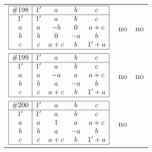 \documentclass[12pt]{article}
\theoremstyle{definition}
\newcommand{\join}{\mathbin{+}}%
\newcommand{\id}{{1'}}%
\renewcommand{\top}{1}%
\begin{document}
\begin{center}
\begin{longtable}{l|c|c}
$
\begin{array}{|c|cccc|} \hline
\#198 & \id & a & b & c \\ \hline
\id & \id & a & b & c \\
a & a & -b & 0 & a \join c \\
b & b & 0 & -a & b \\
c & c & a \join c & b & \id \join a \\ \hline
\end{array}
$
 & no  
 & no      \\[15mm]

$
\begin{array}{|c|cccc|} \hline
\#199 & \id & a & b & c \\ \hline
\id & \id & a & b & c \\
a & a & -a & a & a \join c \\
b & b & a & -a & b \\
c & c & a \join c & b & \id \join a \\ \hline
\end{array}
$
 & no  
 & no      \\[15mm]

$
\begin{array}{|c|cccc|} \hline
\#200 & \id & a & b & c \\ \hline
\id & \id & a & b & c \\
a & a & \top & a & a \join c \\
b & b & a & -a & b \\
c & c & a \join c & b & \id \join a \\ \hline
\end{array}
$
 & no  
 & \adjustbox{valign=c, max height=1.6cm}{$
\left[ \begin{array}{ccccccc}
\id & a & a & b & c & a & b \\ 
a & \id & a & a & a & c & a \\ 
a & a & \id & a & a & c & a \\ 
b & a & a & \id & b & a & b \\ 
c & a & a & b & \id & a & b \\ 
a & c & c & a & a & \id & a \\ 
b & a & a & b & b & a & \id
\end{array}\right]
$}      \\[15mm]


\end{longtable}
\end{center}
\end{document}
